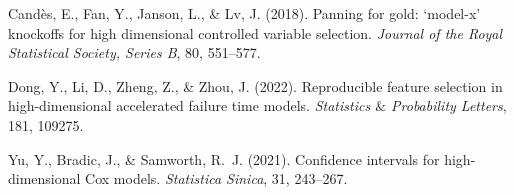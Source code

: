 \documentclass[11pt]{article}
\begin{document}

\begin{thebibliography}{}	
	Cand{\`e}s, E., Fan, Y., Janson, L., \& Lv, J. (2018).
	\newblock Panning for gold: ‘model-x’ knockoffs for high dimensional
	controlled variable selection.
	\newblock \textit{Journal of the Royal Statistical Society, Series B},
	80, 551--577.
	
	
	Dong, Y., Li, D., Zheng, Z., \& Zhou, J. (2022).
	\newblock Reproducible feature selection in high-dimensional accelerated
	failure time models.
	\newblock \textit{Statistics $\&$ Probability Letters}, 181, 109275.
	
	
	Yu, Y., Bradic, J., \& Samworth, R.~J. (2021).
	\newblock Confidence intervals for high-dimensional {Cox} models.
	\newblock \textit{Statistica Sinica}, 31, 243--267.	
\end{thebibliography}
\end{document}
